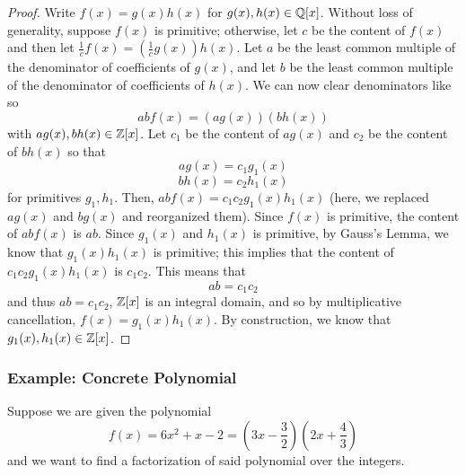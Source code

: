 \documentclass[letterpaper]{article}
\begin{document}
\begin{mdframed}[]
    \begin{proof}
        Write $f(x) = g(x)h(x)$ for $g(x), h(x) \in \mathbb{Q}[x]$. Without loss of generality, suppose $f(x)$ is primitive; otherwise, let $c$ be the content of $f(x)$ and then let $\frac{1}{c}f(x) = \left(\frac{1}{c}g(x)\right)h(x)$. Let $a$ be the least common multiple of the denominator of coefficients of $g(x)$, and let $b$ be the least common multiple of the denominator of coefficients of $h(x)$. We can now clear denominators like so
        \[abf(x) = (ag(x))(bh(x))\]
        with $ag(x), bh(x) \in \mathbb{Z}[x]$. Let $c_1$ be the content of $ag(x)$ and $c_2$ be the content of $bh(x)$ so that 
        \[ag(x) = c_1 g_1 (x)\]
        \[bh(x) = c_2 h_1 (x)\]
        for primitives $g_1, h_1$. Then, $abf(x) = c_1 c_2 g_1 (x) h_1 (x)$ (here, we replaced $ag(x)$ and $bg(x)$ and reorganized them). Since $f(x)$ is primitive, the content of $abf(x)$ is $ab$. Since $g_1 (x)$ and $h_1 (x)$ is primitive, by Gauss's Lemma, we know that $g_1 (x) h_1 (x)$ is primitive; this implies that the content of $c_1 c_2 g_1 (x) h_1 (x)$ is $c_1 c_2$. This means that 
        \[ab = c_1 c_2\]
        and thus $ab = c_1 c_2$, $\mathbb{Z}[x]$ is an integral domain, and so by multiplicative cancellation, $f(x) = g_1 (x) h_1 (x)$. By construction, we know that $g_1 (x), h_1 (x) \in \mathbb{Z}[x]$. 
    \end{proof}
\end{mdframed}

\subsubsection{Example: Concrete Polynomial}
Suppose we are given the polynomial
\[f(x) = 6x^2 + x - 2 = \left(3x - \frac{3}{2}\right) \left(2x + \frac{4}{3}\right)\]
and we want to find a factorization of said polynomial over the integers. 
\end{document}

